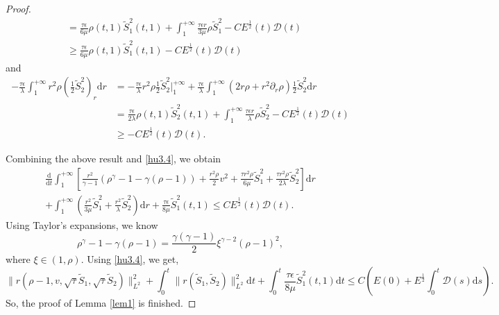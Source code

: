 \documentclass[10pt,reqno]{amsart}
\numberwithin{equation}{section}
\begin{document}
\begin{proof}
\begin{equation}
\begin{aligned}
				&= \frac{\tau \epsilon}{6 \mu}\rho(t,1)\tilde{S}_1^2(t,1)
				+\int_{1}^{+\infty} \frac{\tau \epsilon r}{3 \mu} \rho\tilde{S}_1^2
				-C E^{\frac{1}{2}}(t) \mathcal{D}(t)\\
				&\geq \frac{\tau \epsilon}{6 \mu}\rho(t,1)\tilde{S}_1^2(t,1)
				-C E^{\frac{1}{2}}(t) \mathcal{D}(t)
			\end{aligned}
		\end{equation}
		and
		\begin{equation}\nonumber
			\begin{aligned}
				-\frac{\tau  \epsilon}{\lambda} \int_{1}^{+\infty} r^2\rho \left(\frac{1}{2}\tilde{S}_2^2\right)_r\mathrm{d} r
				&=-\frac{\tau  \epsilon}{\lambda} r^2\rho \frac{1}{2}\tilde{S}_2^2 \bigg|_1^{+\infty}
				+\frac{\tau \epsilon}{\lambda} \int_{1}^{+\infty}(2r\rho+r^2\partial_r\rho)\frac{1}{2}\tilde{S}_2^2\mathrm{d} r\\
				&= \frac{\tau \epsilon}{2\lambda}\rho(t,1)\tilde{S}_2^2(t,1) +\int_{1}^{+\infty} \frac{\tau \epsilon r}{\lambda} \rho \tilde{S}_2^2
				-C E^{\frac{1}{2}}(t) \mathcal{D}(t)\\
				&\geq-C E^{\frac{1}{2}}(t) \mathcal{D}(t)
				.
			\end{aligned}
		\end{equation}
		
		
		
		Combining the above result and \eqref{hu3.4}, we obtain
		\begin{equation}
			\begin{aligned}
				\frac{\mathrm{d}}{\mathrm{d} t} \int_{1}^{+\infty}\left[ \frac{r^2}{\gamma-1}\left(\rho^\gamma-1-\gamma(\rho-1)\right) 
				+\frac{r^2 \rho}{2} v^2+\frac{\tau   r^2 \rho}{6 \mu}  \tilde{S}_1^2+\frac{\tau  r^2 \rho}{2\lambda} \tilde{S}_2^2\right] \mathrm{d} r\\
				+\int_{1}^{+\infty} (\frac{r^2} {3\mu} \tilde{S}_1^2+\frac{r^2}{\lambda} \tilde{S}_2^2) \mathrm{d} r
				+\frac{\tau \epsilon}{8 \mu}\tilde{S}_1^2(t,1)\leq
				C E^{\frac{1}{2}}(t) \mathcal{D}(t).
			\end{aligned}
		\end{equation}
		Using Taylor's expansions, we know
		\begin{equation}
			\rho^\gamma-1-\gamma(\rho-1)=\frac{\gamma(\gamma-1)}{2}\xi^{\gamma-2}(\rho-1)^2,
		\end{equation}
		where $\xi\in(1,\rho)$.
		Using \eqref{hu3.4}, we get,
		\begin{equation}
			\|r(\rho-1, v, \sqrt{\tau  } \tilde{S}_1, \sqrt{\tau } \tilde{S}_2)\|_{L^2}^2+\int_0^t\|r(\tilde{S}_1,\tilde{S}_2)\|_{L^2}^2 \mathrm{d}t 
			+\int_{0}^{t}\frac{\tau \epsilon}{8 \mu}\tilde{S}_1^2(t,1)\mathrm{d}t\leq 
			C \left(E(0)+E^{\frac{1}{2}} \int_0^t \mathcal{D}(s) \mathrm{d}s\right).
		\end{equation}
		So, the proof of Lemma \ref{lem1} is finished.
	\end{proof}
\end{document}
